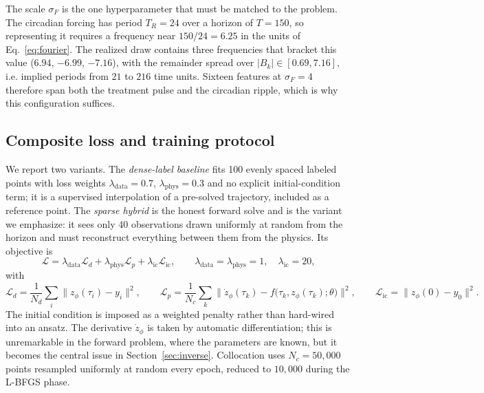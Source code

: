 \documentclass[11pt]{article}
\begin{document}
The scale $\sigma_F$ is the one hyperparameter that must be matched to the
problem. The circadian forcing has period $T_R = 24$ over a horizon of $T=150$,
so representing it requires a frequency near $150/24 = 6.25$ in the units of
Eq.~\eqref{eq:fourier}. The realized draw contains three frequencies that
bracket this value ($6.94$, $-6.99$, $-7.16$), with the remainder spread over
$|B_k| \in [0.69, 7.16]$, i.e. implied periods from $21$ to $216$ time units.
Sixteen features at $\sigma_F = 4$ therefore span both the treatment pulse and
the circadian ripple, which is why this configuration suffices.

\subsection{Composite loss and training protocol}

We report two variants. The \emph{dense-label baseline} fits 100 evenly spaced
labeled points with loss weights $\lambda_{\text{data}} = 0.7$,
$\lambda_{\text{phys}} = 0.3$ and no explicit initial-condition term; it is a
supervised interpolation of a pre-solved trajectory, included as a reference
point. The \emph{sparse hybrid} is the honest forward solve and is the variant
we emphasize: it sees only 40 observations drawn uniformly at random from the
horizon and must reconstruct everything between them from the physics. Its
objective is
\begin{equation}
\mathcal{L} = \lambda_{\text{data}}\mathcal{L}_d
+ \lambda_{\text{phys}}\mathcal{L}_p
+ \lambda_{\text{ic}}\mathcal{L}_{\text{ic}},
\qquad
\lambda_{\text{data}} = \lambda_{\text{phys}} = 1,\quad
\lambda_{\text{ic}} = 20,
\label{eq:fwdloss}
\end{equation}
with
\begin{equation}
\mathcal{L}_d = \frac{1}{N_d}\sum_{i}\big\|z_\phi(\tau_i) - y_i\big\|^2,
\qquad
\mathcal{L}_p = \frac{1}{N_c}\sum_{k}
\Big\|\dot z_\phi(\tau_k) - f\big(\tau_k, z_\phi(\tau_k);\theta\big)\Big\|^2,
\qquad
\mathcal{L}_{\text{ic}} = \big\|z_\phi(0) - y_0\big\|^2 .
\end{equation}
The initial condition is imposed as a weighted penalty rather than hard-wired
into an ansatz. The derivative $\dot z_\phi$ is taken by automatic
differentiation; this is unremarkable in the forward problem, where the
parameters are known, but it becomes the central issue in
Section~\ref{sec:inverse}. Collocation uses $N_c = 50{,}000$ points resampled
uniformly at random every epoch, reduced to $10{,}000$ during the L-BFGS phase.
\end{document}
